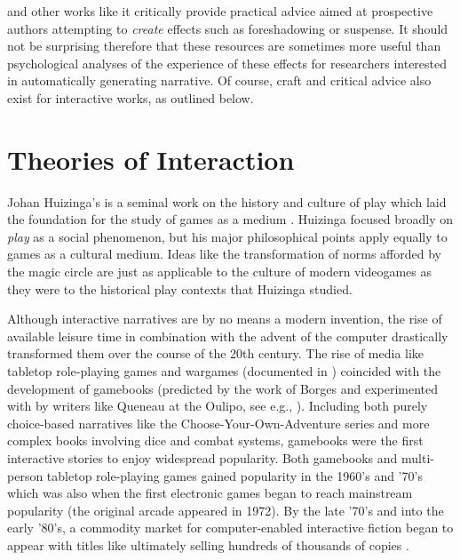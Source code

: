  and other works like it critically provide practical advice aimed at prospective authors attempting to \emph{create} effects such as foreshadowing or suspense.
%
It should not be surprising therefore that these resources are sometimes more useful than psychological analyses of the experience of these effects for researchers interested in automatically generating narrative.
%
Of course, craft and critical advice also exist for interactive works, as outlined below.


\section{Theories of Interaction}

Johan Huizinga's  is a seminal work on the history and culture of play which laid the foundation for the study of games as a medium \citep{Huizinga1949}.
%
Huizinga focused broadly on \emph{play} as a social phenomenon, but his major philosophical points apply equally to games as a cultural medium.
%
Ideas like the transformation of norms afforded by the magic circle are just as applicable to the culture of modern videogames as they were to the historical play contexts that Huizinga studied.


Although interactive narratives are by no means a modern invention, the rise of available leisure time in combination with the advent of the computer drastically transformed them over the course of the 20th century.
%
The rise of media like tabletop role-playing games and wargames (documented in \citep{Peterson2012}) coincided with the development of gamebooks (predicted by the work of Borges \citep{Borges1956} and experimented with by writers like Queneau at the Oulipo, see e.g., \citep{Queneau1967}).
%
Including both purely choice-based narratives like the Choose-Your-Own-Adventure series and more complex books involving dice and combat systems, gamebooks were the first interactive stories to enjoy widespread popularity.
%
Both gamebooks and multi-person tabletop role-playing games gained popularity in the 1960's and '70's which was also when the first electronic games began to reach mainstream popularity (the original arcade  appeared in 1972).
%
By the late '70's and into the early '80's, a commodity market for computer-enabled interactive fiction began to appear with titles like  ultimately selling hundreds of thousands of copies \citep{Zork}.


